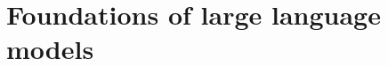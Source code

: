 \documentclass[11pt,a4paper,oneside,openany]{book}
\begin{document}
\frontmatter

\tableofcontents



\mainmatter

\part{Foundations of large language models}








% 
% 
% 
% 
% 
% 
% 
% 
% 
% 
% 
% 

\backmatter


\end{document}

